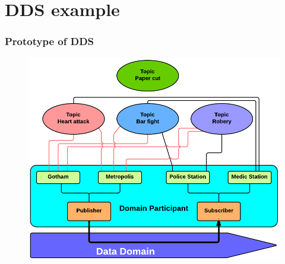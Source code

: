 \documentclass{beamer}
\begin{document}
\section{DDS example}
	\begin{frame}
		\frametitle{Prototype of DDS}
		
		\begin{figure}[hbtp]
		\centering
		\includegraphics[width=\linewidth]{Prototype}
		\end{figure}
		
	\end{frame} 
\end{document}
